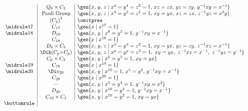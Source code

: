 \begin{displaymath}
\begin{array}{c|c|l}
   & Q_8 \times C_2 & \gen{x,\,y,\,z \mid x^4 = y^4 = z^2 = 1,\, xz = zx,\, yz = zy,\, y^{-1}xy = x^{-1}} \\
   & \text{Pauli Group} & \gen{x,\,y,\,z \mid x^4 = y^2 = z^2 = 1,\, xy = yx,\, xz = zx,\, z^{-1}yz = x^2 y}\\
   & {(C_2)}^4 & {\omitpres} \\
\midrule
17 & C_{17} & \gen{x \mid x^{17} = 1} \\
\midrule
18 & D_{18} & \gen{x,\,y \mid x^8 = y^2 = 1,\, y^{-1}xy = x^{-1}} \\
   & C_{18} & \gen{x \mid x^{18} = 1} \\
   & D_6 \times C_3 & \gen{x,\,y,\,z \mid x^3 = y^3 = z^2 = 1,\, xy = yx,\, yz = zy,\, z^{-1}xz = x^{-1}} \\
   & \Dih(C_p {\times} C_p) & \gen{x,\,y,\,z \mid x^p = y^p = z^2 = 1,\ xy = yx,\ z^{-1}xz = x^{-1},\ z^{-1}yz = y^{-1}} \\
   & C_6 \times C_3 & \gen{x,\,y \mid x^6 = y^3 = 1,\, xy = yx} \\
\midrule
19 & C_{19} & \gen{x \mid x^{19} = 1} \\
\midrule
20 & \Dic_{20} & \gen{x,\,y \mid x^{10} = 1,\, x^5 = y^2,\, y^{-1}xy = x^{-1}} \\
   & C_{20} & \gen{x \mid x^{20} = 1} \\
   & \text{---} & \gen{x,\,y \mid x^5 = y^4 = 1,\, y^{-1}xy = x^2} \\
   & D_{20} & \gen{x,\,y \mid x^{10} = y^2 = 1,\, y^{-1}xy = x^{-1}} \\
   & C_{10} \times C_{2} & \gen{x,\,y \mid x^{10} = y^2 = 1,\, xy = yx} \\
\bottomrule
\end{array}
\end{displaymath}
\vfill
\pagebreak

